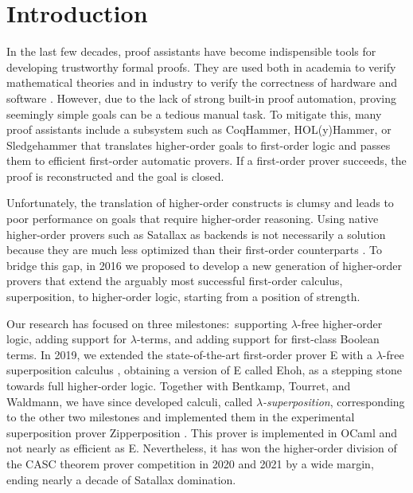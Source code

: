 \setcounter{footnote}{0}

\section{Introduction}
\label{sec:ehoh2:introduction}

In the last few decades, proof assistants have become indispensible tools for
developing trustworthy formal proofs. They are used both in academia to verify
mathematical theories \cite{th-05-flyspeck} and in
industry to verify the correctness of hardware \cite{ckmg-99-hw-verification}
and software \cite{xl-09-compcert, gk-09-sel4, rgea-16-certikos}.
%
However, due to the lack of strong built-in proof automation, proving
seemingly simple goals can be a tedious manual task. To mitigate
this, many proof assistants include a subsystem such as CoqHammer,
HOL(y)Hammer, or Sledgehammer \cite{bkpu-16-hammering} that translates
higher-order goals to first-order logic and passes them to efficient
first-order automatic provers. If a first-order prover succeeds, the proof is
reconstructed and the goal is closed.

Unfortunately, the translation of higher-order constructs is clumsy and leads
to poor performance on goals that require higher-order reasoning.
Using native higher-order provers
such as %
Satallax \cite{cb-12-satallax} as backends
is not necessarily a solution because they are much less optimized than their
first-order counterparts \cite{ns-13-leo2sh}. To bridge this gap, in 2016
we proposed to develop a new generation of higher-order provers that
extend the arguably most successful first-order calculus, superposition, to
higher-order logic, starting from a position of strength.

Our research has focused on three milestones:\ supporting $\lambda$-free
higher-order logic, adding support for $\lambda$-terms, and adding support for
first-class Boolean terms. In 2019, we extended the state-of-the-art first-order
prover E \cite{scv-19-e23} with a $\lambda$-free superposition calculus
\cite{section-ehoh}, obtaining a version of E called Ehoh, as a stepping stone
towards full higher-order logic. Together with Bentkamp, Tourret, and Waldmann,
we have since developed calculi, called \emph{$\lambda$-superposition}, corresponding
to the other two milestones \cite{bbtvw-21-sup-lam,bbtv-21-full-ho-sup} and
implemented them in the experimental superposition prover Zipperposition
\cite{sc-15-simon-phd}. This prover is implemented in OCaml and not nearly as
efficient as E. Nevertheless, it has won the higher-order division of the CASC
theorem prover competition \cite{gs-21-cascj10} in 2020 and 2021 by a wide
margin, ending nearly a decade of Satallax domination.

